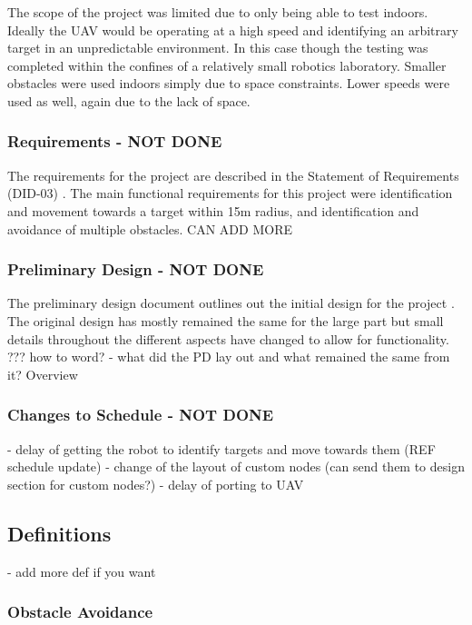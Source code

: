 \documentclass{article}
\begin{document}
	The scope of the project was limited due to only being able to test indoors. Ideally the UAV would be operating at a high speed and identifying an arbitrary target in an unpredictable environment. In this case though the testing was completed within the confines of a relatively small robotics laboratory. Smaller obstacles were used indoors simply due to space constraints. Lower speeds were used as well, again due to the lack of space. 


		\subsubsection{Requirements - NOT DONE}
	The requirements for the project are described in the Statement of Requirements (DID-03) \cite{sor}. The main functional requirements for this project were identification and movement towards a target within 15m radius, and identification and avoidance of multiple obstacles. CAN ADD MORE

		\subsubsection{Preliminary Design - NOT DONE}
	The preliminary design document outlines out the initial design for the project \cite{pdd}. 
The original design has mostly remained the same for the large part but small details throughout the different aspects have changed to allow for functionality. ??? how to word?
	- what did the PD lay out and what remained the same from it? Overview

		\subsubsection{Changes to Schedule - NOT DONE}

	- delay of getting the robot to identify targets and move towards them (REF schedule update) \cite{schupd}
	- change of the layout of custom nodes (can send them to design section for custom nodes?)
	- delay of porting to UAV

	\subsection{Definitions}
	- add more def if you want
	
		\subsubsection{Obstacle Avoidance}
		
\end{document}
